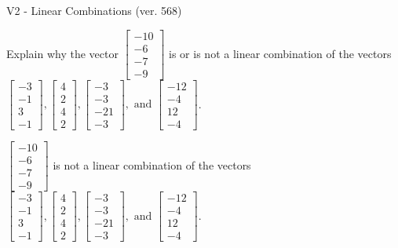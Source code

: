 \begin{exercise}
  \begin{exerciseTitle}V2 - Linear Combinations (ver. 568)\end{exerciseTitle}
  \begin{exerciseStatement}
    Explain why the vector \(\left[\begin{array}{c}
-10 \\
-6 \\
-7 \\
-9
\end{array}\right]\)  is or is not a linear 
	combination of the vectors \(\left[\begin{array}{c}
-3 \\
-1 \\
3 \\
-1
\end{array}\right] , \left[\begin{array}{c}
4 \\
2 \\
4 \\
2
\end{array}\right] , \left[\begin{array}{c}
-3 \\
-3 \\
-21 \\
-3
\end{array}\right] , \text{ and } \left[\begin{array}{c}
-12 \\
-4 \\
12 \\
-4
\end{array}\right]\).
	


  \end{exerciseStatement}
  \begin{exerciseAnswer}
   \(\left[\begin{array}{c}
-10 \\
-6 \\
-7 \\
-9
\end{array}\right]\) 
  	 is not  
	a linear combination of the vectors \(\left[\begin{array}{c}
-3 \\
-1 \\
3 \\
-1
\end{array}\right] , \left[\begin{array}{c}
4 \\
2 \\
4 \\
2
\end{array}\right] , \left[\begin{array}{c}
-3 \\
-3 \\
-21 \\
-3
\end{array}\right] , \text{ and } \left[\begin{array}{c}
-12 \\
-4 \\
12 \\
-4
\end{array}\right]\).


\end{exerciseAnswer}
\end{exercise}
